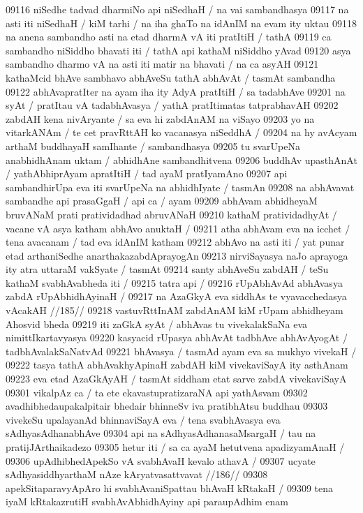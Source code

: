 09116 niSedhe tadvad dharmiNo api niSedhaH / na vai sambandhasya 
09117 na asti iti niSedhaH / kiM tarhi / na iha ghaTo na idAnIM na evam ity uktau
09118 na anena sambandho asti na etad dharmA vA iti pratItiH / tathA  
09119 ca sambandho niSiddho bhavati iti / tathA api kathaM niSiddho yAvad  
09120 asya sambandho dharmo vA na asti iti matir na bhavati / na ca asyAH  
09121 kathaMcid bhAve sambhavo abhAveSu tathA abhAvAt / tasmAt sambandha 
09122 abhAvapratIter na ayam iha ity AdyA pratItiH / sa tadabhAve 
09201 na syAt / pratItau vA tadabhAvasya / yathA pratItimatas tatprabhavAH
09202 zabdAH kena nivAryante / sa eva hi zabdAnAM na viSayo  
09203 yo na vitarkANAm / te cet pravRttAH ko vacanasya niSeddhA /  
09204 na hy avAcyam arthaM buddhayaH samIhante / sambandhasya  
09205 tu svarUpeNa anabhidhAnam uktam / abhidhAne sambandhitvena 
09206 buddhAv upasthAnAt / yathAbhiprAyam apratItiH / tad ayaM pratIyamAno
09207 api sambandhirUpa eva iti svarUpeNa na abhidhIyate / tasmAn 
09208 na abhAvavat sambandhe api prasaGgaH / api ca / ayam  
09209 abhAvam abhidheyaM bruvANaM prati pratividadhad abruvANaH  
09210 kathaM pratividadhyAt / vacane vA asya katham abhAvo anuktaH /
09211 atha abhAvam eva na icchet / tena avacanam / tad eva idAnIM  katham 
09212 abhAvo na asti iti / yat punar etad arthaniSedhe anarthakazabdAprayogAn
09213 nirviSayasya naJo aprayoga ity atra uttaraM vakSyate / tasmAt
09214 santy abhAveSu zabdAH / teSu kathaM svabhAvabheda iti /
09215 tatra api /
09216 	rUpAbhAvAd abhAvasya zabdA rUpAbhidhAyinaH /  
09217 	na AzaGkyA eva siddhAs te vyavacchedasya vAcakAH //185//  
09218 vastuvRttInAM zabdAnAM kiM rUpam abhidheyam Ahosvid bheda 
09219 iti zaGkA syAt / abhAvas tu vivekalakSaNa eva nimittIkartavyasya  
09220 kasyacid rUpasya abhAvAt tadbhAve abhAvAyogAt / tadbhAvalakSaNatvAd
09221 bhAvasya / tasmAd ayam eva sa mukhyo vivekaH /  
09222 tasya tathA abhAvakhyApinaH zabdAH kiM vivekaviSayA ity asthAnam  
09223 eva etad AzaGkAyAH / tasmAt siddham etat sarve zabdA vivekaviSayA  
09301 vikalpAz ca / ta ete ekavastupratizaraNA api yathAsvam
09302 avadhibhedaupakalpitair bhedair bhinneSv iva pratibhAtsu buddhau 
09303 vivekeSu upalayanAd bhinnaviSayA eva / tena svabhAvasya eva sAdhyasAdhanabhAve
09304 api na sAdhyasAdhanasaMsargaH / tau na pratijJArthaikadezo  
09305 hetur iti / sa ca ayaM hetutvena apadizyamAnaH / 
09306 	upAdhibhedApekSo vA svabhAvaH kevalo athavA /  
09307 	ucyate sAdhyasiddhyarthaM nAze kAryatvasattvavat //186//
09308 apekSitaparavyApAro hi svabhAvaniSpattau bhAvaH kRtakaH / 
09309 tena iyaM kRtakazrutiH svabhAvAbhidhAyiny api paraupAdhim enam  
